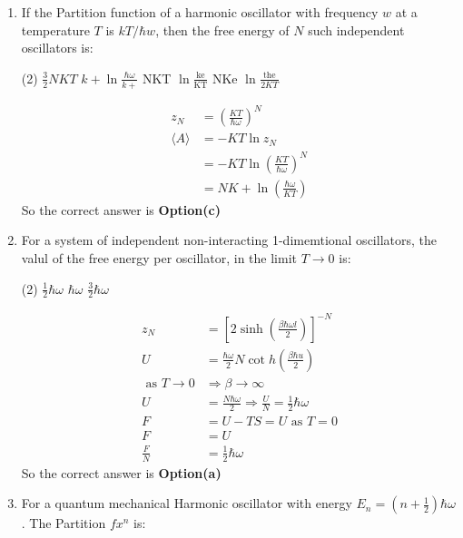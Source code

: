 \begin{enumerate}
	\item If the Partition function of a harmonic oscillator with frequency $w$ at a temperature $T$ is $k T/ \hbar w$, then the free energy of $N$ such independent oscillators is:
		\begin{tasks}(2)
			\task[\textbf{a.}]$\frac{3}{2} N K T$
			\task[\textbf{b.}]$k+\ln \frac{\hbar \omega}{k+}$
			\task[\textbf{c.}]NKT $\ln \frac{\mathrm{ke}}{\mathrm{KT}}$
			\task[\textbf{d.}] NKe $\ln \frac{\text { the }}{2 K T}$
		\end{tasks}
	\begin{answer}
		\begin{align*}
		z_{N} &=\left(\frac{K T}{\hbar \omega}\right)^{N} \\
		\langle A\rangle &=-K T \ln z_{N} \\
		&=-K T \ln \left(\frac{K T}{\hbar \omega}\right)^{N} \\
		&=N K+\ln \left(\frac{\hbar \omega}{K T}\right)
		\end{align*}
		So the correct answer is \textbf{Option(c)}
	\end{answer}
\item For a system of independent non-interacting 1-dimemtional oscillators, the valul of the free energy per oscillator, in the limit $T \rightarrow 0$ is:
	\begin{tasks}(2)
		\task[\textbf{a.}] $\frac{1}{2} \hbar \omega$
		\task[\textbf{b.}]$\hbar\omega$
		\task[\textbf{c.}]$\frac{3}{2} \hbar \omega$
		\task[\textbf{d.}] 0
	\end{tasks}
\begin{answer}
	\begin{align*}
	z_{N}&=\left[2 \sinh \left(\frac{\beta \hbar \omega l}{2}\right)\right]^{-N}\\
	U&=\frac{\hbar \omega}{2} N \cot h\left(\frac{\beta \hbar u}{2}\right)\\
	\text { as } T \rightarrow 0 &\Rightarrow \beta \rightarrow \infty\\
	U&=\frac{N \hbar \omega}{2} \Rightarrow \frac{U}{N}=\frac{1}{2} \hbar \omega\\
	F&=U-T S=U \text { as } T=0\\
	F&=U\\
	\frac{F}{N}&=\frac{1}{2} \hbar \omega
	\end{align*}
	So the correct answer is \textbf{Option(a)}
\end{answer}	
\item For a quantum mechanical Harmonic oscillator with energy $E_{n}=\left(n+\frac{1}{2}\right) \hbar \omega$. The Partition $f x^{n}$ is:

\end{enumerate}
